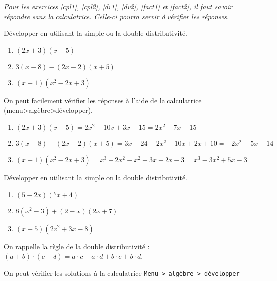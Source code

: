 

	
{\it 
Pour les exercices \ref{cpl1}, \ref{cpl2}, \ref{dv1}, \ref{dv2}, \ref{fact1} et \ref{fact2}, il faut savoir répondre sans la calculatrice. Celle-ci pourra servir à vérifier les réponses.
}



\begin{exo}[type=solution]
Développer en utilisant la simple ou la double distributivité.

\begin{enumerate}[label=\bf{\alph*)\,}]
\item $(2x+3)(x-5)$
\item $3(x-8)-(2x-2)(x+5)$
\item $(x-1)(x^2-2x+3)$
\end{enumerate}


\begin{sol}
On peut facilement vérifier les réponses à l'aide de la calculatrice (menu>algèbre>développer).
\begin{enumerate}[label=\bf{\alph*)\,}]
\item $(2x+3)(x-5)=2x^2-10x+3x-15=2x^2-7x-15$
\item $3(x-8)-(2x-2)(x+5)=3x-24-2x^2-10x+2x+10=-2x^2-5x-14$
\item $(x-1)(x^2-2x+3)=x^3-2x^2-x^2+3x+2x-3=x^3-3x^2+5x-3$
\end{enumerate}

\end{sol}


\end{exo}



\begin{exo}
Développer en utilisant la simple ou la double distributivité.

\begin{enumerate}[label=\bf{\alph*)\,}]
\item $(5-2x)(7x+4)$
\item $8(x^2-3)+(2-x)(2x+7)$
\item $(x-5)(2x^2+3x-8)$
\end{enumerate}

\begin{sol*}
On rappelle la règle de la double distributivité : $(a+b)\cdot(c+d)=a\cdot c+a \cdot d+ b \cdot c+ b \cdot d$.

On peut vérifier les solutions à la calculatrice \texttt{Menu > algèbre > développer}
\end{sol*}

\end{exo}






